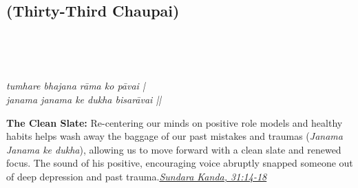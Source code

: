 
\newpage

\subsection*{ (Thirty-Third Chaupai)}

\begin{minipage}[t]{0.55\textwidth}
\vspace{0pt}

{\large \linespread{1.5}\selectfont
{}\\
\par}

\vspace{0.5em}

{\large \linespread{1.5}\selectfont
{}\\
\par}

\vspace{0.5em}

{\large \linespread{1.3}\selectfont
\textit{tumhare bhajana rāma ko pāvai |}\\
\textit{janama janama ke dukha bisarāvai ||}
\par}
\end{minipage}%
\hfill
\begin{minipage}[t]{0.42\textwidth}
\vspace{0pt}
\begin{tcolorbox}[anchorbox]
\textbf{The Clean Slate:} Re-centering our minds on positive role models and healthy habits helps wash away the baggage of our past mistakes and traumas (\textit{Janama Janama ke dukha}), allowing us to move forward with a clean slate and renewed focus.
\vspace{0.5em}\newline The sound of his positive, encouraging voice abruptly snapped someone out of deep depression and past trauma.\newline\null\hfill\href{https://www.valmiki.iitk.ac.in/sloka?field_kanda_tid=5&language=dv&field_sarga_value=31}{\textit{Sundara Kanda, 31:14-18}}
\end{tcolorbox}
\end{minipage}

\vspace{0.5em}
